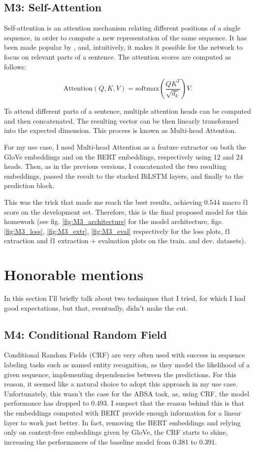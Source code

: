 \documentclass[11pt,a4paper]{article}
\begin{document}
	\subsection{M3: Self-Attention}
	Self-attention is an attention mechanism relating different positions
	of a single sequence, in order to compute a new representation of the same sequence.
	It has been made popular by \citep{vaswani2017attention}, and, intuitively, it
	makes it possible for the network to focus on relevant parts of a sentence. The
	attention scores are computed as follows:
	
	\begin{equation}
	\mathrm{Attention}(Q, K, V) = \mathrm{softmax}(\frac{QK^T}{\sqrt{d_k}})V.
	\end{equation}
	
	To attend different parts of a sentence, multiple attention heads can be
	computed and then concatenated. The resulting vector can be then linearly
	transformed into the expected dimension. This process is known as Multi-head
	Attention.
	
	For my use case, I used Multi-head Attention as a feature extractor on both the
	GloVe embeddings and on the BERT embeddings, respectively using 12 and 24 heads.
	Then, as in the previous versions, I concatenated the two resulting embeddings, passed the result to the stacked BiLSTM layers, and finally to the prediction block.
	
	This was the trick that made me reach the best results, achieving 0.544 macro
	f1 score on the development set. Therefore, this is the final proposed model for
	this homework (see fig. \ref{fig:M3_architecture} for the model architecture,
	figs. \ref{fig:M3_loss}, \ref{fig:M3_extr}, \ref{fig:M3_eval} respectively for
	the loss plots, f1 extraction and f1 extraction + evaluation plots on the train.
	and dev. datasets).
	
	\section{Honorable mentions}
	In this section I'll briefly talk about two techniques that I tried, for	which I had good expectations, but that, eventually, didn't make the cut.
	
	\subsection{M4: Conditional Random Field}
	Conditional Random Fields (CRF) \citep{lafferty2001conditional} are very often used
	with success in sequence labeling tasks such as named entity recognition, as
	they model the likelihood of a given sequence, implementing dependencies between
	the predictions.  For this reason, it seemed like a natural choice to adopt this
	approach in my use case. Unfortunately, this wasn't the case for the ABSA task, as, using CRF, the
	model performance has dropped to 0.493. I suspect that the reason behind this is
	that the embeddings computed with BERT provide enough information for a linear
	layer to work just better. In fact, removing the BERT embeddings and relying	only on context-free embeddings given by GloVe, the CRF starts to shine, increasing the performances of the baseline model from 0.381 to 0.391.
	
\end{document}
